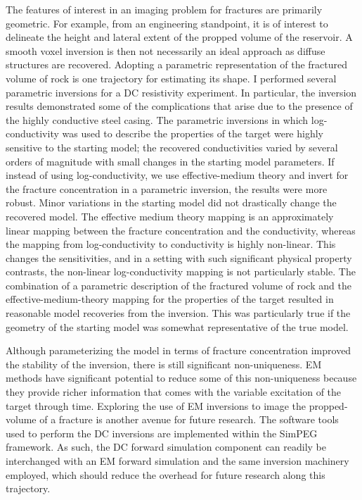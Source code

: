 The features of interest in an imaging problem for fractures are primarily geometric. For example, from an engineering standpoint, it is of interest to delineate the height and lateral extent of the propped volume of the reservoir. A smooth voxel inversion is then not necessarily an ideal approach as diffuse structures are recovered. Adopting a parametric representation of the fractured volume of rock is one trajectory for estimating its shape. I performed several parametric inversions for a DC resistivity experiment. In particular, the inversion results demonstrated some of the complications that arise due to the presence of the highly conductive steel casing. The parametric inversions in which log-conductivity was used to describe the properties of the target were highly sensitive to the starting model; the recovered conductivities varied by several orders of magnitude with small changes in the starting model parameters. If instead of using log-conductivity, we use effective-medium theory and invert for the fracture concentration in a parametric inversion, the results were more robust. Minor variations in the starting model did not drastically change the recovered model. The effective medium theory mapping is an approximately linear mapping between the fracture concentration and the conductivity, whereas the mapping from log-conductivity to conductivity is highly non-linear. This changes the sensitivities, and in a setting with such significant physical property contrasts, the non-linear log-conductivity mapping is not particularly stable. The combination of a parametric description of the fractured volume of rock and the effective-medium-theory mapping for the properties of the target resulted in reasonable model recoveries from the inversion. This was particularly true if the geometry of the starting model was somewhat representative of the true model.

Although parameterizing the model in terms of fracture concentration improved the stability of the inversion, there is still significant non-uniqueness. EM methods have significant potential to reduce some of this non-uniqueness because they provide richer information that comes with the variable excitation of the target through time. Exploring the use of EM inversions to image the propped-volume of a fracture is another avenue for future research. The software tools used to perform the DC inversions are implemented within the SimPEG framework. As such, the DC forward simulation component can readily be interchanged with an EM forward simulation and the same inversion machinery employed, which should reduce the overhead for future research along this trajectory.


